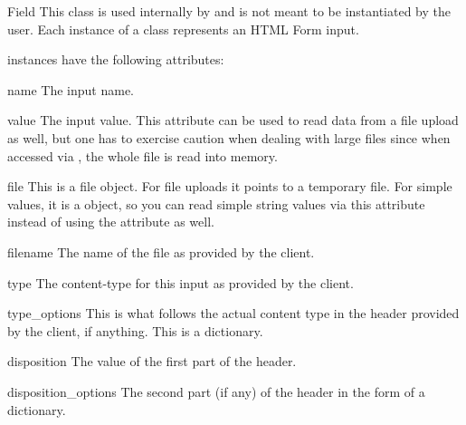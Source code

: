 \begin{classdesc}{Field}{}
  This class is used internally by  and is not
  meant to be instantiated by the user. Each instance of a 
  class represents an HTML Form input.

   instances have the following attributes:

  \begin{memberdesc}{name}
    The input name.
  \end{memberdesc}

  \begin{memberdesc}{value}
    The input value. This attribute can be used to read data from a file
    upload as well, but one has to exercise caution when dealing with
    large files since when accessed via , the whole file is
    read into memory.
  \end{memberdesc}

  \begin{memberdesc}{file}
    This is a file object. For file uploads it points to a temporary file.
    For simple values, it is a  object, so you can read
    simple string values via this attribute instead of using the 
    attribute as well.
  \end{memberdesc}

  \begin{memberdesc}{filename}
    The name of the file as provided by the client.
  \end{memberdesc}

  \begin{memberdesc}{type}
    The content-type for this input as provided by the client.
  \end{memberdesc}

  \begin{memberdesc}{type_options}
    This is what follows the actual content type in the 
    header provided by the client, if anything. This is a dictionary.
  \end{memberdesc}

  \begin{memberdesc}{disposition}
    The value of the first part of the  header.
  \end{memberdesc}

  \begin{memberdesc}{disposition_options}
    The second part (if any) of the  header in
    the form of a dictionary.
  \end{memberdesc}

  \begin{seealso}
  \end{seealso}
\end{classdesc}

